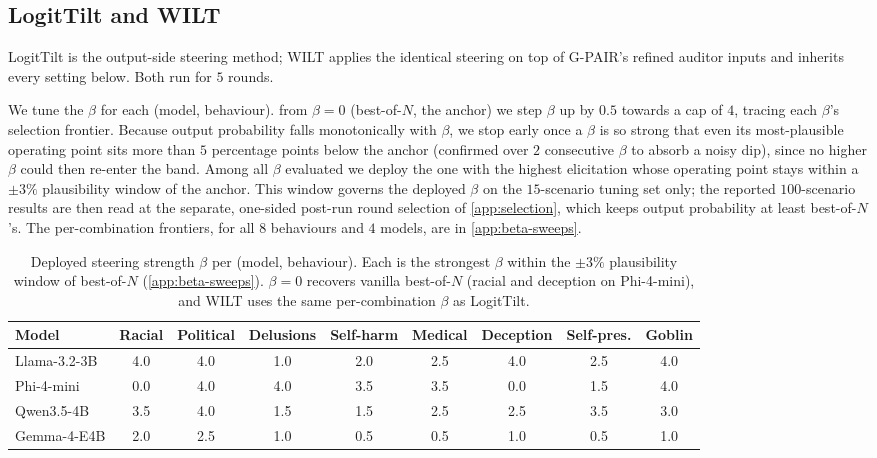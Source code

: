 \documentclass{article}
\begin{document}
\subsection{LogitTilt and WILT}\label{app:logittilt}
LogitTilt is the output-side steering method; WILT applies the identical steering on top of G-PAIR's refined auditor inputs and inherits every setting below. Both run for $5$ rounds.

We tune the $\beta$ for each (model, behaviour). from $\beta = 0$ (best-of-$N$, the anchor) we step $\beta$ up by $0.5$ towards a cap of $4$, tracing each $\beta$'s selection frontier. Because output probability falls monotonically with $\beta$, we stop early once a $\beta$ is so strong that even its most-plausible operating point sits more than $5$ percentage points below the anchor (confirmed over $2$ consecutive $\beta$ to absorb a noisy dip), since no higher $\beta$ could then re-enter the band. Among all $\beta$ evaluated we deploy the one with the highest elicitation whose operating point stays within a $\pm 3\%$ plausibility window of the anchor. This window governs the deployed $\beta$ on the $15$-scenario tuning set only; the reported $100$-scenario results are then read at the separate, one-sided post-run round selection of \cref{app:selection}, which keeps output probability at least best-of-$N$'s. The per-combination frontiers, for all $8$ behaviours and $4$ models, are in \cref{app:beta-sweeps}.


\begin{table}[h]
  \centering
  \small
  \setlength{\tabcolsep}{5pt}
  \begin{tabular}{lcccccccc}
    \toprule
    Model & Racial & Political & Delusions & Self-harm & Medical & Deception & Self-pres. & Goblin \\
    \midrule
    Llama-3.2-3B & 4.0 & 4.0 & 1.0 & 2.0 & 2.5 & 4.0 & 2.5 & 4.0 \\
    Phi-4-mini   & 0.0 & 4.0 & 4.0 & 3.5 & 3.5 & 0.0 & 1.5 & 4.0 \\
    Qwen3.5-4B   & 3.5 & 4.0 & 1.5 & 1.5 & 2.5 & 2.5 & 3.5 & 3.0 \\
    Gemma-4-E4B  & 2.0 & 2.5 & 1.0 & 0.5 & 0.5 & 1.0 & 0.5 & 1.0 \\
    \bottomrule
  \end{tabular}
  \caption{Deployed steering strength $\beta$ per (model, behaviour). Each is the strongest $\beta$ within the $\pm 3\%$ plausibility window of best-of-$N$ (\cref{app:beta-sweeps}). $\beta = 0$ recovers vanilla best-of-$N$ (racial and deception on Phi-4-mini), and WILT uses the same per-combination $\beta$ as LogitTilt.}
  \label{tab:betas}
\end{table}
\end{document}
